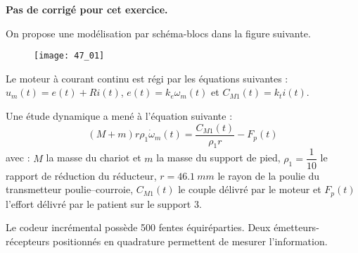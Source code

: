 \normaltrue \difficilefalse \tdifficilefalse
\correctiontrue

\setcounter{numques}{0}
\ifcorrection
\else
\textbf{Pas de corrigé pour cet exercice.}
\fi



\ifprof
\else
On propose une modélisation par schéma-blocs dans la figure suivante. 
\begin{figure}[H]
\centering
{\texttt{[image: 47\_01]}}
\end{figure}




Le moteur à courant continu est régi par les équations suivantes :
$ u_m(t)=e(t)+Ri(t)$, $e(t)=k_e\omega_m(t)$ et $C_{M1}(t)=k_t i(t)$. 

Une étude dynamique a mené à l'équation suivante : 
$$\left(M+m\right)r\rho_1 \dot{\omega}_m(t)=\dfrac{C_{M1}(t)}{\rho_1 r}-F_p(t)$$ avec : $M$ la masse du chariot et $m$ la masse du support de pied, $\rho_1=\dfrac{1}{10}$ le rapport de réduction du réducteur, $r=\SI{46,1}{mm}$ le rayon de la poulie du transmetteur poulie--courroie, $C_{M1}(t)$ le couple délivré par le moteur et $F_p(t)$ l'effort délivré par le patient sur le support 3. 

Le codeur incrémental possède 500 fentes équiréparties. Deux émetteurs-récepteurs positionnés en quadrature permettent de mesurer l'information. 
\fi


